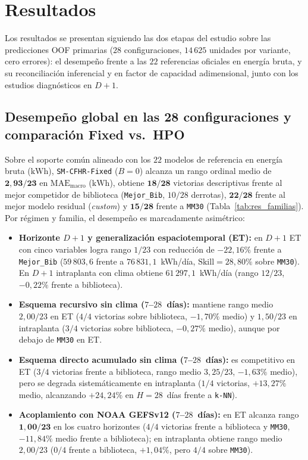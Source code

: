 \section{Resultados}\label{sec:resultados}

Los resultados se presentan siguiendo las dos etapas del estudio sobre las predicciones OOF primarias ($28$ configuraciones, $14\,625$ unidades por variante, cero errores): el desempeño frente a las $22$ referencias oficiales en energía bruta, y su reconciliación inferencial y en factor de capacidad adimensional, junto con los estudios diagnósticos en $D+1$.

\subsection{Desempeño global en las 28 configuraciones y comparación Fixed vs.\ HPO}

Sobre el soporte común alineado con los $22$ modelos de referencia en energía bruta ($\text{kWh}$), \texttt{SM-CFHR-Fixed} ($B=0$) alcanza un rango ordinal medio de $\mathbf{2{,}93/23}$ en $\mathrm{MAE}_{\mathrm{macro}}$ ($\text{kWh}$), obtiene $\mathbf{18/28}$ victorias descriptivas frente al mejor competidor de biblioteca (\texttt{Mejor\_Bib}, $10/28$ derrotas), $\mathbf{22/28}$ frente al mejor modelo residual (\textit{custom}) y $\mathbf{15/28}$ frente a \texttt{MM30} (Tabla~\ref{tab:res_familias}). Por régimen y familia, el desempeño es marcadamente asimétrico:
\begin{itemize}
    \item \textbf{Horizonte $D+1$ y generalización espaciotemporal (ET):} en $D+1$ ET con cinco variables logra rango $1/23$ con reducción de $-22{,}16\%$ frente a \texttt{Mejor\_Bib} ($59\,803{,}6$ frente a $76\,831{,}1$~kWh/día, $\mathrm{Skill}=28{,}80\%$ sobre \texttt{MM30}). En $D+1$ intraplanta con clima obtiene $61\,297{,}1$~kWh/día (rango $12/23$, $-0{,}22\%$ frente a biblioteca).
    \item \textbf{Esquema recursivo sin clima ($7$--$28$~días):} mantiene rango medio $2{,}00/23$ en ET ($4/4$ victorias sobre biblioteca, $-1{,}70\%$ medio) y $1{,}50/23$ en intraplanta ($3/4$ victorias sobre biblioteca, $-0{,}27\%$ medio), aunque por debajo de \texttt{MM30} en ET.
    \item \textbf{Esquema directo acumulado sin clima ($7$--$28$~días):} es competitivo en ET ($3/4$ victorias frente a biblioteca, rango medio $3{,}25/23$, $-1{,}63\%$ medio), pero se degrada sistemáticamente en intraplanta ($1/4$ victorias, $+13{,}27\%$ medio, alcanzando $+24{,}24\%$ en $H=28$~días frente a \texttt{k-NN}).
    \item \textbf{Acoplamiento con NOAA GEFSv12 ($7$--$28$~días):} en ET alcanza rango $\mathbf{1{,}00/23}$ en los cuatro horizontes ($4/4$ victorias frente a biblioteca y \texttt{MM30}, $-11{,}84\%$ medio frente a biblioteca); en intraplanta obtiene rango medio $2{,}00/23$ ($0/4$ frente a biblioteca, $+1{,}04\%$, pero $4/4$ sobre \texttt{MM30}).
\end{itemize}

